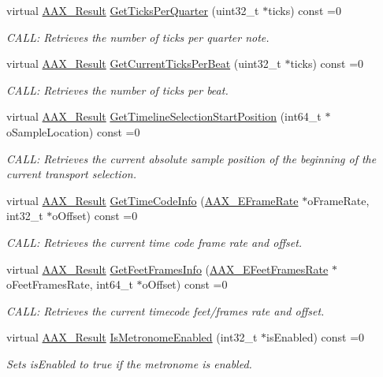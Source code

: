 \begin{DoxyCompactItemize}
virtual \hyperlink{a00149_a4d8f69a697df7f70c3a8e9b8ee130d2f}{A\+A\+X\+\_\+\+Result} \hyperlink{a00116_aa02b3ec8fd6059240260b67c256d9da8}{Get\+Ticks\+Per\+Quarter} (uint32\+\_\+t $\ast$ticks) const =0
\begin{DoxyCompactList}\small\item\em C\+A\+L\+L\+: Retrieves the number of ticks per quarter note. \end{DoxyCompactList}\item 
virtual \hyperlink{a00149_a4d8f69a697df7f70c3a8e9b8ee130d2f}{A\+A\+X\+\_\+\+Result} \hyperlink{a00116_aa5cfd6fef3e4950583ec1e050be692ec}{Get\+Current\+Ticks\+Per\+Beat} (uint32\+\_\+t $\ast$ticks) const =0
\begin{DoxyCompactList}\small\item\em C\+A\+L\+L\+: Retrieves the number of ticks per beat. \end{DoxyCompactList}\item 
virtual \hyperlink{a00149_a4d8f69a697df7f70c3a8e9b8ee130d2f}{A\+A\+X\+\_\+\+Result} \hyperlink{a00116_a639677fc4237183baac85d00f1a5f6d5}{Get\+Timeline\+Selection\+Start\+Position} (int64\+\_\+t $\ast$o\+Sample\+Location) const =0
\begin{DoxyCompactList}\small\item\em C\+A\+L\+L\+: Retrieves the current absolute sample position of the beginning of the current transport selection. \end{DoxyCompactList}\item 
virtual \hyperlink{a00149_a4d8f69a697df7f70c3a8e9b8ee130d2f}{A\+A\+X\+\_\+\+Result} \hyperlink{a00116_a3babe261ec37aa4a61c4cbd74f123bc0}{Get\+Time\+Code\+Info} (\hyperlink{a00206_a1271a51553bf508de59864334111aa8f}{A\+A\+X\+\_\+\+E\+Frame\+Rate} $\ast$o\+Frame\+Rate, int32\+\_\+t $\ast$o\+Offset) const =0
\begin{DoxyCompactList}\small\item\em C\+A\+L\+L\+: Retrieves the current time code frame rate and offset. \end{DoxyCompactList}\item 
virtual \hyperlink{a00149_a4d8f69a697df7f70c3a8e9b8ee130d2f}{A\+A\+X\+\_\+\+Result} \hyperlink{a00116_a0c410bc1dc478785c04cde39891ae587}{Get\+Feet\+Frames\+Info} (\hyperlink{a00206_a8a0c9dafef741a26ee8c06f7285a0dfa}{A\+A\+X\+\_\+\+E\+Feet\+Frames\+Rate} $\ast$o\+Feet\+Frames\+Rate, int64\+\_\+t $\ast$o\+Offset) const =0
\begin{DoxyCompactList}\small\item\em C\+A\+L\+L\+: Retrieves the current timecode feet/frames rate and offset. \end{DoxyCompactList}\item 
virtual \hyperlink{a00149_a4d8f69a697df7f70c3a8e9b8ee130d2f}{A\+A\+X\+\_\+\+Result} \hyperlink{a00116_af5f63a44a115d868aaef2e4a131fb865}{Is\+Metronome\+Enabled} (int32\+\_\+t $\ast$is\+Enabled) const =0
\begin{DoxyCompactList}\small\item\em Sets is\+Enabled to true if the metronome is enabled. \end{DoxyCompactList}\end{DoxyCompactItemize}


